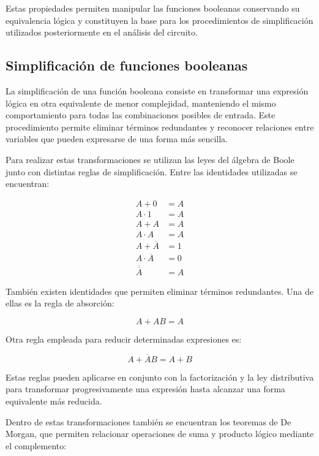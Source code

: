 \documentclass[12pt]{report}
\begin{document}
Estas propiedades permiten manipular las funciones booleanas conservando su equivalencia lógica y constituyen la base para los procedimientos de simplificación utilizados posteriormente en el análisis del circuito.

\subsection{Simplificación de funciones booleanas}

La simplificación de una función booleana consiste en transformar una expresión
lógica en otra equivalente de menor complejidad, manteniendo el mismo comportamiento
para todas las combinaciones posibles de entrada. Este procedimiento permite eliminar
términos redundantes y reconocer relaciones entre variables que pueden expresarse de
una forma más sencilla.

Para realizar estas transformaciones se utilizan las leyes del álgebra de Boole junto
con distintas reglas de simplificación. Entre las identidades utilizadas se encuentran:

\begin{align}
    A + 0 &= A \\
    A \cdot 1 &= A \\
    A + A &= A \\
    A \cdot A &= A \\
    A + \overline{A} &= 1 \\
    A \cdot \overline{A} &= 0 \\
    \overline{\overline{A}} &= A
\end{align}

También existen identidades que permiten eliminar términos redundantes. Una de ellas
es la regla de absorción:

\begin{equation}
    A + AB = A
\end{equation}

Otra regla empleada para reducir determinadas expresiones es:

\begin{equation}
    A + \overline{A}B = A + B
\end{equation}

Estas reglas pueden aplicarse en conjunto con la factorización y la ley distributiva
para transformar progresivamente una expresión hasta alcanzar una forma equivalente
más reducida.

Dentro de estas transformaciones también se encuentran los teoremas de De Morgan,
que permiten relacionar operaciones de suma y producto lógico mediante el complemento:
\end{document}
